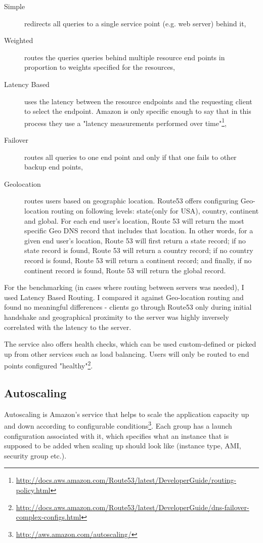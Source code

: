 \documentclass{uvamscse}
\begin{document}
\begin{description}
  \item[Simple] redirects all queries to a single service point (e.g. web server) behind it,
  \item[Weighted] routes the queries queries behind multiple resource end points in proportion to weights specified for the resources,
  \item[Latency Based] uses the latency between the resource endpoints and the requesting client to select the endpoint. Amazon is only specific enough to say that in this process they use a "latency measurements performed over time"\footnote{\url{http://docs.aws.amazon.com/Route53/latest/DeveloperGuide/routing-policy.html}},
  \item[Failover] routes all queries to one end point and only if that one fails to other backup end points,
  \item[Geolocation] routes users based on geographic location. Route53 offers configuring Geo-location routing on following levels: state(only for USA), country, continent and global. For each end user’s location, Route 53 will return the most specific Geo DNS record that includes that location. In other words, for a given end user’s location, Route 53 will first return a state record; if no state record is found, Route 53 will return a country record; if no country record is found, Route 53 will return a continent record; and finally, if no continent record is found, Route 53 will return the global record.
\end{description}

For the benchmarking (in cases where routing between servers was needed), I used Latency Based Routing. I compared it against Geo-location routing and found no meaningful differences - clients go through Route53 only during initial handshake and geographical proximity to the server was highly inversely correlated with the latency to the server.

The service also offers health checks, which can be used custom-defined or picked up from other services such as load balancing. Users will only be routed to end points configured "healthy"\footnote{\url{http://docs.aws.amazon.com/Route53/latest/DeveloperGuide/dns-failover-complex-configs.html}}.

\subsection{Autoscaling}

Autoscaling is Amazon's service that helps to scale the application capacity up and down according to configurable conditions\footnote{\url{http://aws.amazon.com/autoscaling/}}. Each group has a launch configuration associated with it, which specifies what an instance that is supposed to be added when scaling up should look like (instance type, AMI, security group etc.).
\end{document}
